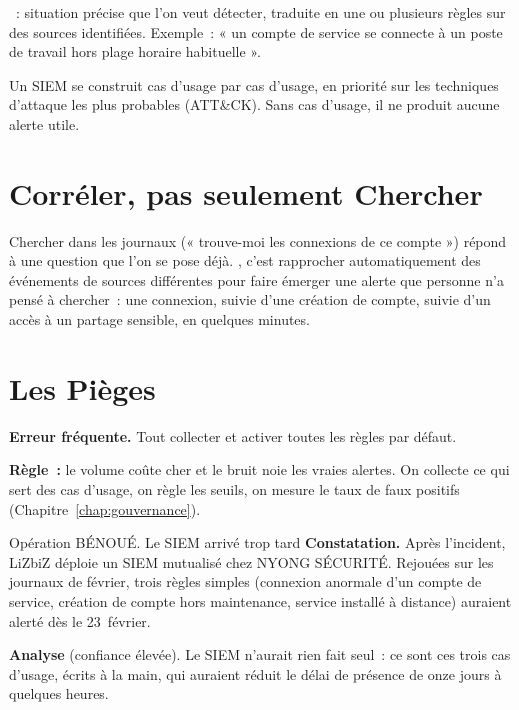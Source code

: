 \begin{boxdef}
~: situation précise que l'on veut
détecter, traduite en une ou plusieurs règles sur des sources identifiées.
Exemple~: « un compte de service se connecte à un poste de travail hors
plage horaire habituelle ».
\end{boxdef}

Un SIEM se construit cas d'usage par cas d'usage, en priorité sur les
techniques d'attaque les plus probables (ATT\&CK). Sans cas d'usage, il ne
produit aucune alerte utile.

\section{Corréler, pas seulement Chercher}
\label{sec:c05-correler}

Chercher dans les journaux (« trouve-moi les connexions de ce compte »)
répond à une question que l'on se pose déjà. , c'est
rapprocher automatiquement des événements de sources différentes pour faire
émerger une alerte que personne n'a pensé à chercher~: une connexion, suivie
d'une création de compte, suivie d'un accès à un partage sensible, en
quelques minutes.

\section{Les Pièges}
\label{sec:c05-pieges}

\begin{boxalert}
\textbf{Erreur fréquente.} Tout collecter et activer toutes les règles par
défaut.

\smallskip
\textbf{Règle~:} le volume coûte cher et le bruit noie les vraies alertes. On
collecte ce qui sert des cas d'usage, on règle les seuils, on mesure le taux
de faux positifs (Chapitre~\ref{chap:gouvernance}).
\end{boxalert}

\begin{boxscenario}{Opération BÉNOUÉ. Le SIEM arrivé trop tard}
\textbf{Constatation.} Après l'incident, LiZbiZ déploie un SIEM mutualisé
chez NYONG SÉCURITÉ. Rejouées sur les journaux de février, trois règles
simples (connexion anormale d'un compte de service, création de compte hors
maintenance, service installé à distance) auraient alerté dès le 23~février.

\medskip
\textbf{Analyse} (confiance élevée). Le SIEM n'aurait rien fait seul~: ce sont
ces trois cas d'usage, écrits à la main, qui auraient réduit le délai de
présence de onze jours à quelques heures.
\end{boxscenario}

